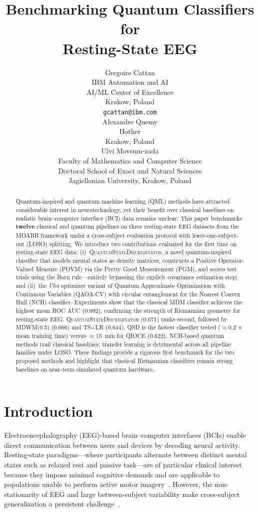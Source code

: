\documentclass{article}
\title{Benchmarking Quantum Classifiers for\\
Resting-State EEG}
\author{%
  Gregoire Cattan \\
  IBM Automation and AI \\
  AI/ML Center of Excellence \\
  Krakow, Poland \\
  \texttt{gcattan@ibm.com} \\
  \And
  Alexandre Quemy \\
  Hother \\
  Krakow, Poland \\
  \And
  Ulvi Movsum-zada \\
  Faculty of Mathematics and Computer Science \\
  Doctoral School of Exact and Natural Sciences \\
  Jagiellonian University, Krakow, Poland \\
}
\begin{document}
\maketitle

\begin{abstract}
Quantum-inspired and quantum machine learning (QML) methods have attracted
considerable interest in neurotechnology, yet their benefit over classical
baselines on realistic brain--computer interface (BCI) data remains unclear.
This paper benchmarks \textbf{twelve} classical and quantum pipelines on
three resting-state EEG datasets from the MOABB framework under a
cross-subject evaluation protocol with leave-one-subject-out (LOSO) splitting.
We introduce two contributions evaluated for the first time on resting-state
EEG data: (i)~\textsc{QuantumStateDiscriminator}, a novel quantum-inspired
classifier that models mental states as density matrices, constructs a
Positive Operator-Valued Measure (POVM) via the Pretty Good Measurement
(PGM), and scores test trials using the Born rule---entirely bypassing
the explicit covariance estimation step; and (ii)~the \emph{Ulvi} optimizer
variant of Quantum Approximate Optimization with Continuous Variables
(QAOA-CV) with circular entanglement for the Nearest Convex Hull (NCH)
classifier.
Experiments show that the classical MDM classifier achieves the highest
mean ROC AUC (0.692), confirming the strength of Riemannian geometry for
resting-state EEG.  \textsc{QuantumStateDiscriminator} (0.671) ranks second,
followed by MDWM(0.5) (0.666) and TS+LR (0.644).  QSD is the fastest
classifier tested ($\approx$0.2~s mean training time) versus $\approx$15~min
for QIOCE (0.622).  NCH-based quantum methods trail classical baselines;
transfer learning is detrimental across all pipeline families under LOSO.
These findings provide a rigorous first benchmark for the two proposed
methods and highlight that classical Riemannian classifiers remain
strong baselines on near-term simulated quantum hardware.
\end{abstract}



\section{Introduction}
\label{sec:intro}

Electroencephalography (EEG)-based brain--computer interfaces (BCIs) enable
direct communication between users and devices by decoding neural activity.
Resting-state paradigms---where participants alternate between distinct mental
states such as relaxed rest and passive task---are of particular clinical
interest because they impose minimal cognitive demands and are applicable to
populations unable to perform active motor imagery~\cite{Cattan2019,Rodrigues2017,Hinss2021}.
However, the non-stationarity of EEG and large between-subject variability
make cross-subject generalization a persistent challenge~\cite{lotte2018review}.
\end{document}
